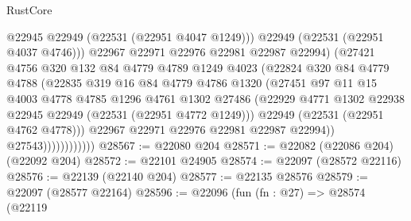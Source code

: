 \begin{lexlean}{RustCore}
\begin{coremodule}
                                @22945
                                @22949
                                (@22531 (@22951 @4047 @1249)))
                              @22949
                              (@22531 (@22951 @4037 @4746)))
                            @22967
                            @22971
                            @22976
                            @22981
                            @22987
                            @22994)
                          (@27421
                            @4756
                            @320
                            @132
                            @84
                            @4779
                            @4789
                            @1249
                            @4023
                            (@22824
                              @320
                              @84
                              @4779
                              @4788
                              (@22835
                                @319
                                @16
                                @84
                                @4779
                                @4786
                                @1320
                                (@27451
                                  @97
                                  @11
                                  @15
                                  @4003
                                  @4778
                                  @4785
                                  @1296
                                  @4761
                                  @1302
                                  @27486
                                  (@22929
                                    @4771
                                    @1302
                                    @22938
                                    @22945
                                    @22949
                                    (@22531 (@22951 @4772 @1249)))
                                  @22949
                                  (@22531 (@22951 @4762 @4778)))
                                @22967
                                @22971
                                @22976
                                @22981
                                @22987
                                @22994))
                            @27543))))))))))))
@28567 := @22080 @204
@28571 := @22082 (@22086 @204) (@22092 @204)
@28572 := @22101 @24905
@28574 := @22097 (@28572 @22116)
@28576 := @22139 (@22140 @204)
@28577 := @22135 @28576
@28579 := @22097 (@28577 @22164)
@28596 := @22096
    (fun (fn : @27) =>
    @28574
      (@22119

\end{coremodule}
\end{lexlean}
